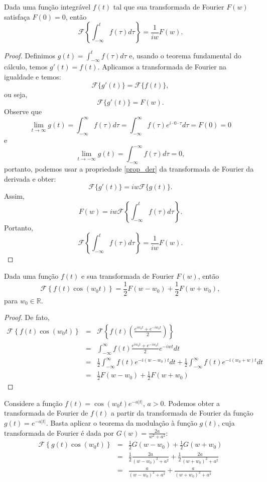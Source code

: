 \begin{propr}\label{prop_int} Dada uma função integrável $f(t)$ tal que sua transformada de Fourier $F(w)$ satisfaça $F(0)=0$, então
$$
\mathcal{F}\left\{\int_{-\infty}^t f(\tau)d\tau \right\}=\frac{1}{iw}F(w).
$$
\end{propr}
\begin{proof}
Definimos $g(t)=\int_{-\infty}^t f(\tau)d\tau$ e, usando o teorema fundamental do cálculo, temos $g'(t)=f(t)$. Aplicamos a transformada de Fourier na igualdade e temos:
$$
\mathcal{F}\{g'(t)\}=\mathcal{F}\{f(t)\},
$$
ou seja,
$$
\mathcal{F}\{g'(t)\}=F(w).
$$
Observe que
$$
\lim_{t\to\infty} g(t)=\int_{-\infty}^\infty f(\tau)d\tau=\int_{-\infty}^\infty f(\tau)e^{i\cdot 0 \cdot \tau}d\tau=F(0)=0
$$
e
$$
\lim_{t\to-\infty} g(t)=\int_{-\infty}^{-\infty} f(\tau)d\tau=0,
$$
portanto, podemos usar a propriedade \ref{prop_der} da transformada de Fourier da derivada e obter:
$$
\mathcal{F}\{g'(t)\}=iw \mathcal{F}\{g(t)\}.
$$
Assim,
$$
F(w)=iw \mathcal{F}\left\{\int_{-\infty}^t f(\tau)d\tau\right\}.
$$
Portanto,
$$
\mathcal{F}\left\{\int_{-\infty}^t f(\tau)d\tau\right\}=\frac{1}{iw}F(w).
$$
\end{proof}

\begin{propr}\label{prop_mod}  Dada uma função $f(t)$ e sua transformada de Fourier $F(w)$, então
$$
\mathcal{F}\left\{f(t)\cos(w_0t) \right\}=\frac{1}{2}F(w-w_0)+\frac{1}{2}F(w+w_0),
$$
para $w_0\in\mathbb{R}$.
\end{propr}
\begin{proof}
De fato,
\begin{eqnarray*}
\mathcal{F}\left\{f(t)\cos(w_0t) \right\}&=&\mathcal{F}\left\{f(t)\left(\frac{e^{iw_0t}+e^{-iw_0t}}{2} \right)\right\} \\
&=&\int_{-\infty}^\infty f(t)\frac{e^{iw_0t}+e^{-iw_0t}}{2}e^{-iwt}dt  \\
&=&\frac{1}{2}\int_{-\infty}^\infty f(t)e^{-i(w-w_0)t}dt+\frac{1}{2}  \int_{-\infty}^\infty f(t)e^{-i(w_0+w)t}dt\\
&=&\frac{1}{2}F(w-w_0)+\frac{1}{2}F(w+w_0)
\end{eqnarray*}
\end{proof}
\begin{ex}{\label{ex_prop_trans_1.0}}Considere a função $f(t)=\cos(w_0t) e^{-a|t|}$, $a>0$. Podemos obter a transformada de Fourier de $f(t)$ a partir da transformada de Fourier da função $g(t)=e^{-a|t|}$. Basta aplicar o teorema da modulação à função $g(t)$, cuja transformada de Fourier é dada por $G(w)=\frac{2a}{w^2+a^2}$:
\begin{eqnarray*}
\mathcal{F}\left\{g(t)\cos(w_0t) \right\}&=&\frac{1}{2}G(w-w_0)+\frac{1}{2}G(w+w_0)\\
&=&\frac{1}{2}\frac{2a}{(w-w_0)^2+a^2}+\frac{1}{2}\frac{2a}{(w+w_0)^2+a^2}\\
&=&\frac{a}{(w-w_0)^2+a^2}+\frac{a}{(w+w_0)^2+a^2}
\end{eqnarray*}
\end{ex}

